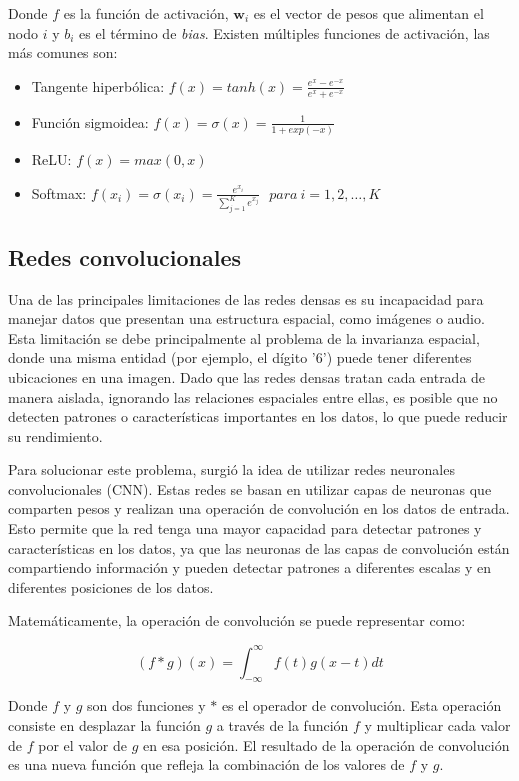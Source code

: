 Donde $f$ es la función de activación, $\mathbf{w}_i$ es el vector de pesos que alimentan el nodo $i$ y $b_i$ es el
término de {\it bias}. Existen múltiples funciones de activación, las más comunes son:

\begin{itemize}
  \item Tangente hiperbólica: $f(x) = tanh(x) = \frac{e^x - e^{-x}}{e^x + e^{-x}}$
  \item Función sigmoidea: $f(x) = \sigma(x) = \frac{1}{1+exp(-x)}$
  \item ReLU: $f(x) = max(0, x)$
  \item Softmax: $f(x_i) = \sigma(x_i) = \frac{e^{x_{i}}}{\sum_{j=1}^K e^{x_{j}}} \ \ \ para\ i=1,2,\dots,K$
\end{itemize}

\subsection{Redes convolucionales}
Una de las principales limitaciones de las redes densas es su incapacidad para manejar datos que presentan una
estructura espacial, como imágenes o audio. Esta limitación se debe principalmente al problema de la invarianza
espacial, donde una misma entidad (por ejemplo, el dígito '6') puede tener diferentes ubicaciones en una imagen. Dado
que las redes densas tratan cada entrada de manera aislada, ignorando las relaciones espaciales entre ellas, es posible
que no detecten patrones o características importantes en los datos, lo que puede reducir su rendimiento.

Para solucionar este problema, surgió la idea de utilizar redes neuronales convolucionales (CNN). Estas redes se basan
en utilizar capas de neuronas que comparten pesos y realizan una operación de convolución en los datos de entrada. Esto
permite que la red tenga una mayor capacidad para detectar patrones y características en los datos, ya que las neuronas
de las capas de convolución están compartiendo información y pueden detectar patrones a diferentes escalas y en
diferentes posiciones de los datos.

Matemáticamente, la operación de convolución se puede representar como:

\begin{equation}
  (f * g)(x) = \int_{-\infty}^{\infty} f(t)g(x-t) dt
  \label{eq:convolucion}
\end{equation}

Donde $f$ y $g$ son dos funciones y $*$ es el operador de convolución. Esta operación consiste en desplazar la función
$g$ a través de la función $f$ y multiplicar cada valor de $f$ por el valor de $g$ en esa posición. El resultado de la
operación de convolución es una nueva función que refleja la combinación de los valores de $f$ y $g$.

